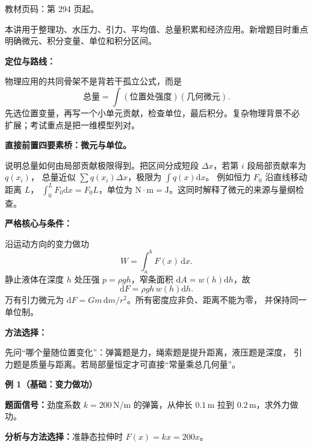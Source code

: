 
\begin{knowledgeBox}
教材页码：第 294 页起。

本讲用于整理功、水压力、引力、平均值、总量积累和经济应用。新增题目时重点明确微元、积分变量、单位和积分区间。
\end{knowledgeBox}


\par

\begin{knowledgeBox}
\textbf{定位与路线：}

物理应用的共同骨架不是背若干孤立公式，而是
\[
\boxed{\text{总量}=\int(\text{位置处强度})(\text{几何微元}).}
\]
先选位置变量，再写一个小单元贡献，检查单位，最后积分。复杂物理背景不必
扩展；考试重点是把一维模型列对。

\textbf{直接前置四要素桥：微元与单位。}

说明总量如何由局部贡献极限得到。把区间分成短段
\(\Delta x\)，若第 \(i\) 段局部贡献率为 \(q(x_i)\)，
总量近似 \(\sum q(x_i)\Delta x\)，极限为 \(\int q(x)\mathrm dx\)。
例如恒力 \(F_0\) 沿直线移动距离 \(L\)，
\(\int_0^LF_0\mathrm dx=F_0L\)，单位为
\(\mathrm N\cdot\mathrm m=\mathrm J\)。这同时解释了微元的来源与量纲检查。

\textbf{严格核心与条件：}

沿运动方向的变力做功
\[
W=\int_a^bF(x)\,\mathrm dx.
\]
静止液体在深度 \(h\) 处压强 \(p=\rho gh\)，窄条面积
\(\mathrm dA=w(h)\mathrm dh\)，故
\[
\mathrm dF=\rho gh\,w(h)\mathrm dh.
\]
万有引力微元为
\(\mathrm dF=Gm\,\mathrm dm/r^2\)。所有密度应非负、距离不能为零，
并保持同一单位制。

\textbf{方法选择：}

先问“哪个量随位置变化”：弹簧题是力，绳索题是提升距离，液压题是深度，
引力题是质量与距离。若局部量恒定才可直接“常量乘总几何量”。

\textbf{例 1（基础：变力做功）}

\textbf{题面信号：}劲度系数 \(k=200\,\mathrm{N/m}\) 的弹簧，从伸长
\(0.1\,\mathrm m\) 拉到 \(0.2\,\mathrm m\)，求外力做功。

\textbf{分析与方法选择：}准静态拉伸时 \(F(x)=kx=200x\)。


\end{knowledgeBox}
